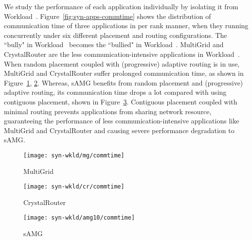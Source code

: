 We study the performance of each application individually by isolating it from Workload~.   
Figure~\ref{fig:syn-apps-commtime} shows the distribution of communication time of three applications in per rank manner, 
when they running concurrently under six different placement and routing configurations.
The ``bully" in Workload~ becomes the ``bullied" in Workload~. 
MultiGrid and CrystalRouter are the less communication-intensive applications in Workload~. 
When random placement coupled with (progressive) adaptive routing is in use, 
MultiGrid and CrystalRouter suffer prolonged communication time, 
as shown in Figure~\ref{fig:syn-mg-commtime}, \ref{fig:syn-cr-commtime}. 
Whereas, sAMG benefits from random placement and (progressive) adaptive routing, 
its communication time drops a lot compared with using contiguous placement, shown in Figure~\ref{fig:syn-samg-commtime}. 
Contiguous placement coupled with minimal routing prevents applications from sharing network resource, 
guaranteeing the performance of less communication-intensive applications like MultiGrid and CrystalRouter 
and causing severe performance degradation to sAMG.

\begin{figure*}[t!]
    \centering
    \begin{subfigure}[t]{0.32\textwidth}
        \centering
        \texttt{[image: syn-wkld/mg/commtime]}
        \caption{MultiGrid}
        \label{fig:syn-mg-commtime}
    \end{subfigure}%
    \begin{subfigure}[t]{0.32\textwidth}
        \centering
        \texttt{[image: syn-wkld/cr/commtime]}
        \caption{CrystalRouter}
        \label{fig:syn-cr-commtime}
    \end{subfigure}%
    \hspace{1em}%
    \begin{subfigure}[t]{0.32\textwidth}
        \centering
        \texttt{[image: syn-wkld/amg10/commtime]}
        \caption{sAMG}
        \label{fig:syn-samg-commtime}
    \end{subfigure}%

   \caption{The communication time of all ranks in each application. Three applications running concurrently on dragonfly network with different placement and routing configurations. The ``bully", sAMG, benefits from random placement and adaptive routing, while the ``bullied", MultiGrid and CrystalRouter, suffer performance degradation.}
   \label{fig:syn-apps-commtime}
\end{figure*}



